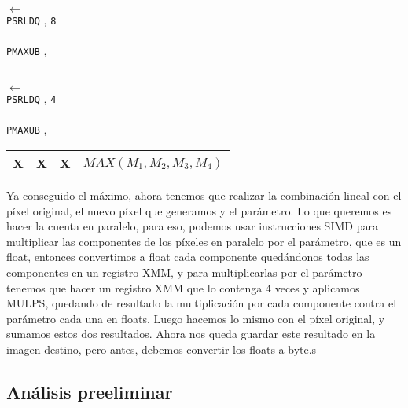 \begin{center}
  \\
 $\leftarrow$  \\
\texttt{PSRLDQ} , \texttt{8} \hfill \\
  \\

\texttt{PMAXUB} ,  \hfill

  \\

 $\leftarrow$  \\
\texttt{PSRLDQ} , \texttt{4} \hfill \\
  \\

\texttt{PMAXUB} ,  \hfill \\

 \vspace{0.1cm}
\begin{tabular}{|C{1cm}|C{1cm}|C{1cm}|C{3.8cm}|}\hline
X & X & X & $MAX(M_1,M_2,M_3,M_4)$ \\ \hline
\end{tabular}
\vspace{0.1cm}

\end{center}

Ya conseguido el máximo, ahora tenemos que realizar la combinación lineal con el píxel original, el nuevo píxel que generamos y el parámetro. Lo que queremos es hacer la cuenta en paralelo, para eso, podemos usar instrucciones SIMD para multiplicar las componentes de los píxeles en paralelo por el parámetro, que es un float, entonces convertimos a float cada componente quedándonos todas las componentes en un registro XMM, y para multiplicarlas por el parámetro tenemos que hacer un registro XMM que lo contenga 4 veces y aplicamos MULPS, quedando de resultado la multiplicación por cada componente contra el parámetro cada una en floats. Luego hacemos lo mismo con el píxel original, y sumamos estos dos resultados. Ahora nos queda guardar este resultado en la imagen destino, pero antes, debemos convertir los floats a byte.s

\subsection{Análisis preeliminar}
